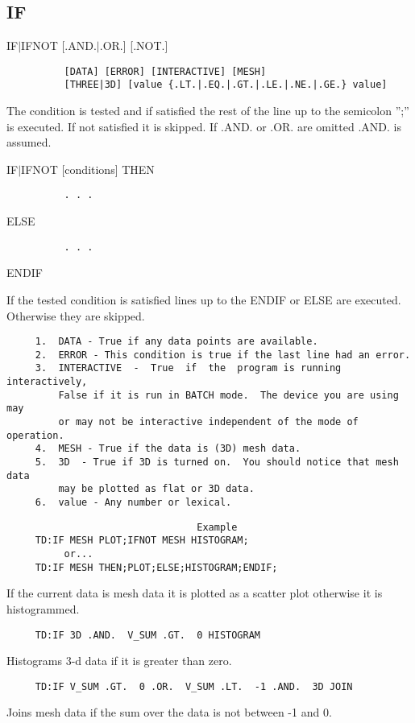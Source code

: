 \subsection{IF}
IF$|$IFNOT [.AND.$|$.OR.] [.NOT.]
\begin{verbatim}
          [DATA] [ERROR] [INTERACTIVE] [MESH]
          [THREE|3D] [value {.LT.|.EQ.|.GT.|.LE.|.NE.|.GE.} value]
\end{verbatim}

The  condition  is tested and if satisfied the rest of the line up to the
semicolon '';'' is executed.  If not satisfied it is skipped.  If .AND.  or
.OR.  are omitted .AND.  is assumed.  

IF$|$IFNOT [conditions] THEN
\begin{verbatim}
          . . .
\end{verbatim}
ELSE
\begin{verbatim}
          . . .
\end{verbatim}
ENDIF

If  the  tested  condition is satisfied lines up to the ENDIF or ELSE are
executed.  Otherwise they are skipped.  
\begin{verbatim}
     1.  DATA - True if any data points are available.  
     2.  ERROR - This condition is true if the last line had an error.  
     3.  INTERACTIVE  -  True  if  the  program is running interactively,
         False if it is run in BATCH mode.  The device you are using  may
         or may not be interactive independent of the mode of operation. 
     4.  MESH - True if the data is (3D) mesh data.  
     5.  3D  - True if 3D is turned on.  You should notice that mesh data
         may be plotted as flat or 3D data.  
     6.  value - Any number or lexical.  
\end{verbatim}

\begin{verbatim}
                                 Example
     TD:IF MESH PLOT;IFNOT MESH HISTOGRAM;  
          or...  
     TD:IF MESH THEN;PLOT;ELSE;HISTOGRAM;ENDIF;  
\end{verbatim}
If  the  current  data  is  mesh  data  it  is  plotted as a scatter plot
otherwise it is histogrammed.  
\begin{verbatim}
     TD:IF 3D .AND.  V_SUM .GT.  0 HISTOGRAM 
\end{verbatim}
Histograms 3-d data if it is greater than zero.  
\begin{verbatim}
     TD:IF V_SUM .GT.  0 .OR.  V_SUM .LT.  -1 .AND.  3D JOIN 
\end{verbatim}
Joins mesh data if the sum over the data is not between -1 and 0.  
